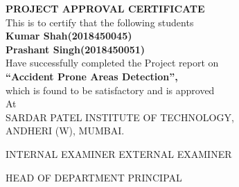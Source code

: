 \documentclass{article}
\begin{document}
\clearpage
\begin{center}
    \thispagestyle{empty}
    \textbf{\Large PROJECT APPROVAL CERTIFICATE\\}
    \bigskip \bigskip
    \large This is to certify that the following students\\
    \bigskip \bigskip \bigskip
    \textbf{
    Kumar Shah(2018450045)\\
    Prashant Singh(2018450051)\\
    }
    \bigskip \bigskip \bigskip
    \large Have successfully completed the Project report on \\ 
    \textbf{\Large“Accident Prone Areas Detection”,}\\
    \large which is found to be satisfactory and is approved\\
    \bigskip \bigskip \bigskip 
    \large At \\
    \bigskip 
    SARDAR PATEL INSTITUTE OF TECHNOLOGY,\\
    ANDHERI (W), MUMBAI.\\
\end{center}
\bigskip \bigskip \bigskip \bigskip \bigskip
\bigskip 
\begin{flushleft}
    INTERNAL EXAMINER
    \hfill
    EXTERNAL EXAMINER
\end{flushleft}
\bigskip \bigskip \bigskip \bigskip \bigskip
\bigskip 
\begin{flushleft}
    HEAD OF DEPARTMENT
    \hfill
    PRINCIPAL
\end{flushleft}
\clearpage
\end{document}
